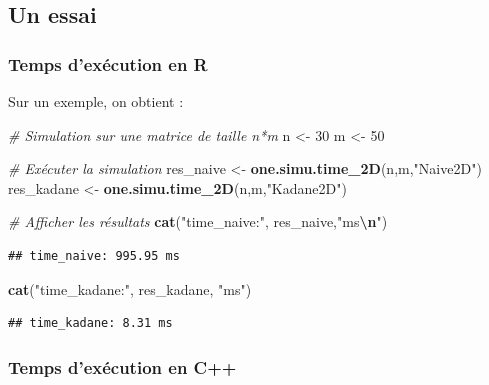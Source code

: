 \documentclass[
]{article}
\newenvironment{Shaded}{\begin{snugshade}}{\end{snugshade}}
\newcommand{\CommentTok}[1]{\textcolor[rgb]{0.56,0.35,0.01}{\textit{#1}}}
\newcommand{\DecValTok}[1]{\textcolor[rgb]{0.00,0.00,0.81}{#1}}
\newcommand{\FunctionTok}[1]{\textcolor[rgb]{0.13,0.29,0.53}{\textbf{#1}}}
\newcommand{\NormalTok}[1]{#1}
\newcommand{\OtherTok}[1]{\textcolor[rgb]{0.56,0.35,0.01}{#1}}
\newcommand{\SpecialCharTok}[1]{\textcolor[rgb]{0.81,0.36,0.00}{\textbf{#1}}}
\newcommand{\StringTok}[1]{\textcolor[rgb]{0.31,0.60,0.02}{#1}}
\begin{document}
\subsection{Un essai}\label{un-essai}

\subsubsection{Temps d'exécution en R}\label{temps-dexuxe9cution-en-r}

Sur un exemple, on obtient :

\begin{Shaded}
\begin{Highlighting}[]
\CommentTok{\# Simulation sur une matrice de taille n*m}
\NormalTok{n }\OtherTok{\textless{}{-}} \DecValTok{30}
\NormalTok{m }\OtherTok{\textless{}{-}} \DecValTok{50}

\CommentTok{\# Exécuter la simulation}
\NormalTok{res\_naive }\OtherTok{\textless{}{-}} \FunctionTok{one.simu.time\_2D}\NormalTok{(n,m,}\StringTok{"Naive2D"}\NormalTok{)}
\NormalTok{res\_kadane }\OtherTok{\textless{}{-}} \FunctionTok{one.simu.time\_2D}\NormalTok{(n,m,}\StringTok{"Kadane2D"}\NormalTok{)}

\CommentTok{\# Afficher les résultats}
\FunctionTok{cat}\NormalTok{(}\StringTok{"time\_naive:"}\NormalTok{, res\_naive,}\StringTok{"ms}\SpecialCharTok{\textbackslash{}n}\StringTok{"}\NormalTok{)}
\end{Highlighting}
\end{Shaded}

\begin{verbatim}
## time_naive: 995.95 ms
\end{verbatim}

\begin{Shaded}
\begin{Highlighting}[]
\FunctionTok{cat}\NormalTok{(}\StringTok{"time\_kadane:"}\NormalTok{, res\_kadane, }\StringTok{"ms"}\NormalTok{)}
\end{Highlighting}
\end{Shaded}

\begin{verbatim}
## time_kadane: 8.31 ms
\end{verbatim}

\subsubsection{Temps d'exécution en C++}\label{temps-dexuxe9cution-en-c}
\end{document}

